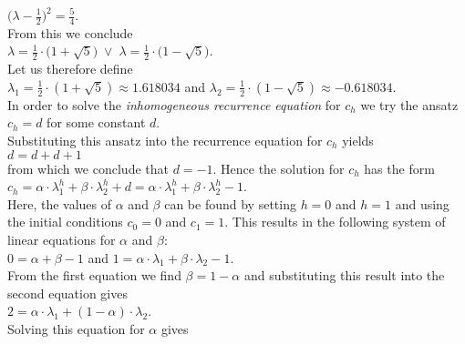 \hspace*{1.3cm}
$\bigl(\lambda - \frac{1}{2}\bigr)^2 = \frac{5}{4}$. 
\\[0.2cm]
From this we conclude 
\\[0.2cm]
\hspace*{1.3cm}
$\lambda = \frac{1}{2} \cdot \bigl(1 + \sqrt{5}\bigr) \;\vee\; \lambda = \frac{1}{2} \cdot \bigl(1 - \sqrt{5}\bigr)$.
\\[0.2cm]
Let us therefore define 
\\[0.2cm]
\hspace*{1.3cm}
$\lambda_1 =  \frac{1}{2} \cdot (1 + \sqrt{5}) \approx  1.618034$ \quad and \quad 
$\lambda_2 = \frac{1}{2} \cdot (1 - \sqrt{5}) \approx -0.618034$.
\\[0.2cm]
In order to solve the \emph{inhomogeneous recurrence equation} for $c_h$ we try the ansatz
\\[0.2cm]
\hspace*{1.3cm}
$c_h = d$ \quad for some constant $d$.
\\[0.2cm]
Substituting this ansatz into the recurrence equation for $c_h$ yields
\\[0.2cm]
\hspace*{1.3cm}
$d = d + d + 1$
\\[0.2cm]
from which we conclude that $d = -1$.  Hence the solution for $c_h$ has the form
\\[0.2cm]
\hspace*{1.3cm}
$c_h = \alpha \cdot \lambda_1^h + \beta \cdot \lambda_2^h + d =\alpha \cdot \lambda_1^h + \beta \cdot \lambda_2^h - 1$.
\\[0.2cm]
Here, the values of $\alpha$ and $\beta$ can be found by setting $h=0$ and $h=1$ and using the
initial conditions $c_0 = 0$ and $c_1 = 1$.  This results in
the following system of linear equations for  $\alpha$ and $\beta$:
\\[0.2cm]
\hspace*{1.3cm}
$0 = \alpha + \beta - 1$ \quad and \quad
$1 = \alpha \cdot \lambda_1 + \beta \cdot \lambda_2 - 1$.
\\[0.2cm]
From the first equation we find $\beta = 1-\alpha$ and substituting this result into the second equation
gives
\\[0.2cm]
\hspace*{1.3cm}
$2 = \alpha \cdot \lambda_1 + (1-\alpha) \cdot \lambda_2$.
\\[0.2cm]
Solving this equation for $\alpha$ gives
\\[0.2cm]
\hspace*{1.3cm}

